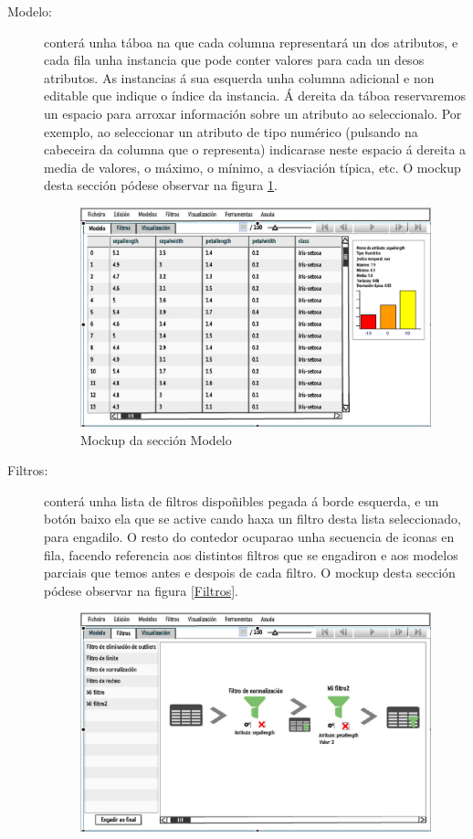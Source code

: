 \begin{description}
\item[Modelo:] conterá unha táboa na que cada columna representará un dos atributos, e cada fila unha instancia que pode conter valores para cada un desos atributos. As instancias á sua esquerda unha columna adicional e non editable que indique o índice da instancia. Á dereita da táboa reservaremos un espacio para arroxar información sobre un atributo ao seleccionalo. Por exemplo, ao seleccionar un atributo de tipo numérico (pulsando na cabeceira da columna que o representa) indicarase neste espacio á dereita a media de valores, o máximo, o mínimo, a desviación típica, etc. O mockup desta sección pódese observar na figura \ref{Modelo}.
\begin{figure}
\centering
\includegraphics[width=\textwidth,height=\textheight,keepaspectratio]{figuras/Modelo}
\caption{Mockup da sección Modelo}
\label{Modelo}
\end{figure}
\item[Filtros:] conterá unha lista de filtros dispoñibles pegada á borde esquerda, e un botón baixo ela que se active cando haxa un filtro desta lista seleccionado, para engadilo. O resto do contedor ocuparao unha secuencia de iconas en fila, facendo referencia aos distintos filtros que se engadiron e aos modelos parciais que temos antes e despois de cada filtro. O mockup desta sección pódese observar na figura \ref{Filtros}.
\begin{figure}
\centering
\includegraphics[width=\textwidth,height=\textheight,keepaspectratio]{figuras/Filtros}

\end{figure}
\end{description}
